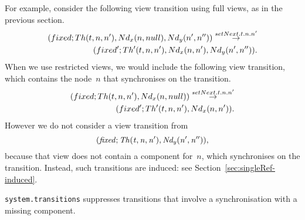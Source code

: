 For example, consider the following view transition using full
views, as in the previous section.
%
\begin{equation}
\begin{align}
\label{trans:setNext}
(fixed; Th(t, n, n'), Nd_x(n, null), Nd_y(n', n'')) 
  \trans{setNext.t.n.n'} \\
\qquad (fixed'; Th'(t, n, n'), Nd_x(n, n'), Nd_y(n', n'')).
\end{align}
\end{equation}
%
When we use restricted views, we would include the following view transition,
which contains the node~$n$ that synchronises on the transition. 
%
\begin{equation}
\label{trans:setNext-singleRef}
\begin{align}
(fixed; Th(t, n, n'), Nd_x(n, null)) 
  \trans{setNext.t.n.n'} \\
\qquad (fixed'; Th'(t, n, n'), Nd_x(n, n')).
\end{align}
\end{equation}
%
However we do not consider a view transition from
\[\mit
(fixed; Th(t, n, n'), Nd_y(n', n'')), 
\]
because that view does not contain a component for~$n$, which synchronises on
the transition.  Instead, such transitions are induced: see
Section~\ref{sec:singleRef-induced}. 

\begin{impNote}
\texttt{system.transitions} suppresses transitions that involve a
synchronisation with a missing component.
\end{impNote}

